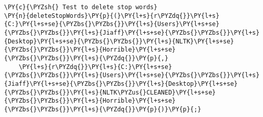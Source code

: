 \begin{Verbatim}[frame=single,commandchars=\\\{\}]
\PY{c}{\PYZsh{} Test to delete stop words}
\PY{n}{deleteStopWords}\PY{p}{(}\PY{l+s}{r\PYZdq{}}\PY{l+s}{C:}\PY{l+s+se}{\PYZbs{}\PYZbs{}}\PY{l+s}{Users}\PY{l+s+se}{\PYZbs{}\PYZbs{}}\PY{l+s}{Jiaff}\PY{l+s+se}{\PYZbs{}\PYZbs{}}\PY{l+s}{Desktop}\PY{l+s+se}{\PYZbs{}\PYZbs{}}\PY{l+s}{NLTK}\PY{l+s+se}{\PYZbs{}\PYZbs{}}\PY{l+s}{Horrible}\PY{l+s+se}{\PYZbs{}\PYZbs{}}\PY{l+s}{\PYZdq{}}\PY{p}{,}
    \PY{l+s}{r\PYZdq{}}\PY{l+s}{C:}\PY{l+s+se}{\PYZbs{}\PYZbs{}}\PY{l+s}{Users}\PY{l+s+se}{\PYZbs{}\PYZbs{}}\PY{l+s}{Jiaff}\PY{l+s+se}{\PYZbs{}\PYZbs{}}\PY{l+s}{Desktop}\PY{l+s+se}{\PYZbs{}\PYZbs{}}\PY{l+s}{NLTK\PYZus{}CLEANED}\PY{l+s+se}{\PYZbs{}\PYZbs{}}\PY{l+s}{Horrible}\PY{l+s+se}{\PYZbs{}\PYZbs{}}\PY{l+s}{\PYZdq{}}\PY{p}{)}\PY{p}{;}
\end{Verbatim}